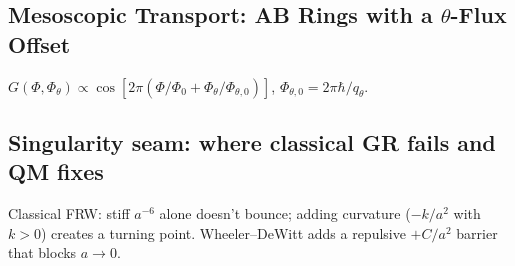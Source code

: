 \subsection{Mesoscopic Transport: AB Rings with a $\theta$-Flux Offset}\label{sec:mesoscopic}
$G(\Phi,\Phi_\theta)\propto \cos[2\pi(\Phi/\Phi_0+\Phi_\theta/\Phi_{\theta,0})]$, $\Phi_{\theta,0}=2\pi\hbar/q_\theta$.

\subsection{Singularity seam: where classical GR fails and QM fixes}\label{sec:singularity-seam}
Classical FRW: stiff $a^{-6}$ alone doesn’t bounce; adding curvature ($-k/a^2$ with $k>0$) creates a turning point. Wheeler--DeWitt adds a repulsive $+C/a^2$ barrier that blocks $a\to 0$.
